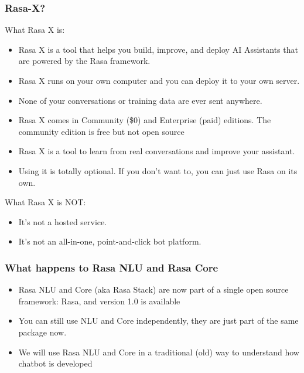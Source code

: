  \begin{frame}[fragile]\frametitle{Rasa-X?}
 What Rasa X is:
\begin{itemize}
\item Rasa X is a tool that helps you build, improve, and deploy AI Assistants that are powered by the Rasa framework. 
\item Rasa X runs on your own computer and you can deploy it to your own server. 
\item None of your conversations or training data are ever sent anywhere.
\item Rasa X comes in Community (\$0) and Enterprise (paid) editions. The community edition is free but not open source
\item Rasa X is a tool to learn from real conversations and improve your assistant.
\item Using it is totally optional. If you don’t want to, you can just use Rasa on its own.
\end{itemize}

 What Rasa X is NOT:
\begin{itemize}
\item It's not a hosted service.
\item It's not an all-in-one, point-and-click bot platform.
\end{itemize}
\end{frame}

 \begin{frame}[fragile]\frametitle{What happens to Rasa NLU and Rasa Core}
\begin{itemize}
\item Rasa NLU and Core (aka Rasa Stack) are now part of a single open source framework: Rasa, and version 1.0 is available
\item You can still use NLU and Core independently, they are just part of the same package now.
\item We will use Rasa NLU and Core in a traditional (old) way to understand how chatbot is developed
\end{itemize}
\end{frame}





